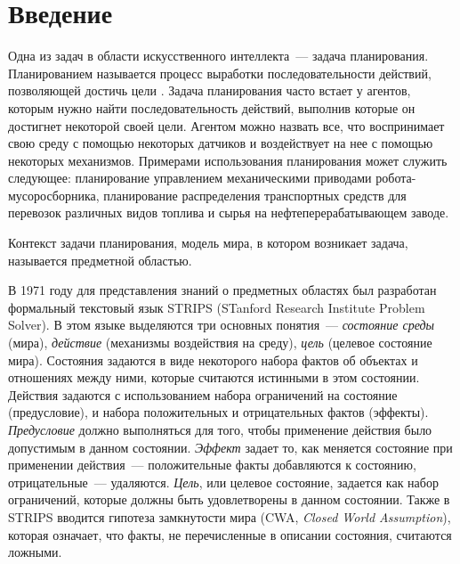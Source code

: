 \chapter*{Введение}

    Одна из задач в области искусственного интеллекта~--- задача планирования.
 Планированием называется процесс выработки последовательности действий, позволяющей достичь цели \cite{norwig-ai}.
 Задача планирования часто встает у агентов, которым нужно найти последовательность действий, выполнив которые он достигнет некоторой своей цели.
 Агентом можно назвать все, что воспринимает свою среду с помощью некоторых датчиков и воздействует на нее с помощью некоторых механизмов.
 Примерами использования планирования может служить следующее: планирование управлением механическими приводами робота-мусоросборника, планирование распределения транспортных средств для перевозок различных видов топлива и сырья на нефтеперерабатывающем заводе.
 
    Контекст задачи планирования, модель мира, в котором возникает задача,  называется предметной областью.
    
    В 1971 году для представления знаний о предметных областях был разработан формальный текстовый язык STRIPS \cite{strips} (STanford Research Institute Problem Solver).
 В этом языке выделяются три основных понятия~--- \textit{состояние среды} (мира), \textit{действие} (механизмы воздействия на среду), \textit{цель} (целевое состояние мира).
 Состояния задаются в виде некоторого набора фактов об объектах и отношениях между ними, которые считаются истинными в этом состоянии.
 Действия задаются с использованием набора ограничений на состояние (предусловие), и набора положительных и отрицательных фактов (эффекты).
 \textit{Предусловие} должно выполняться для того, чтобы применение действия было допустимым в данном состоянии.
 \textit{Эффект} задает то, как меняется состояние при применении действия~--- положительные факты добавляются к состоянию, отрицательные~--- удаляются.
 \textit{Цель}, или целевое состояние, задается как набор ограничений, которые должны быть удовлетворены в данном состоянии.
 Также в STRIPS вводится гипотеза замкнутости мира (CWA, \textit{Closed World Assumption}), которая означает, что факты, не перечисленные в описании состояния, считаются ложными.
    
